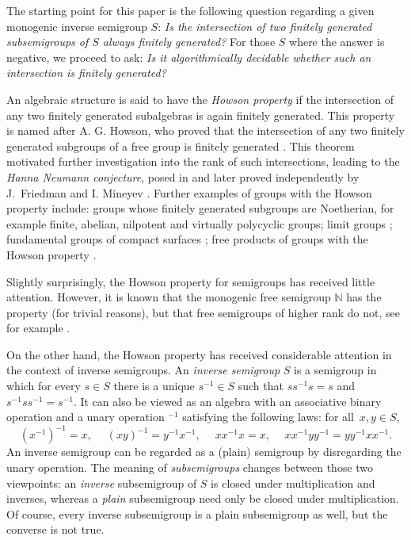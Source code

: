 \documentclass[reqno]{amsart}
\theoremstyle{plain}
\theoremstyle{definition}
\numberwithin{equation}{section}
\begin{document}
The starting point for this paper is the following question regarding a given monogenic inverse semigroup $S$: \emph{Is the intersection of two finitely generated subsemigroups of $S$ always finitely generated?} For those $S$ where the answer is negative, we proceed to ask: \emph{Is it algorithmically decidable whether such an intersection is finitely generated?}

An algebraic structure is said to have the \emph{Howson property} if the intersection of any two finitely generated subalgebras is again finitely generated. This property is named after A. G. Howson, who proved that the intersection of any two finitely generated subgroups of a free group is finitely generated \cite{Howson}. This theorem motivated further investigation into the rank of such intersections, leading to the \emph{Hanna Neumann conjecture}, posed in \cite{Neumann} and later proved independently by J.\ Friedman \cite{Friedman} and I. Mineyev \cite{Mineyev}. Further examples of groups with the Howson property include: 
groups whose finitely generated subgroups are Noetherian, for example finite, abelian, nilpotent and virtually polycyclic groups;
limit groups \cite{Dahmani03}; fundamental groups of compact surfaces \cite{Greenberg60};
free products of groups with the Howson property \cite{Baumslag}.

Slightly surprisingly, the Howson property for semigroups has received little attention. However, it is known that the monogenic free semigroup $\mathbb{N}$ has the property (for trivial reasons), but that free semigroups of higher rank do not, see for example \cite{BlattnerHead}. 


On the other hand, the Howson property has received considerable attention in the context of inverse semigroups.
An \emph{inverse semigroup} $S$ is a semigroup in which for every $s\in S$ there is a unique $s^{-1}\in S$ such that $ss^{-1}s = s$ and $s^{-1}ss^{-1}=s^{-1}$. It can also be viewed as an algebra with an associative binary operation and a unary operation $^{-1}$ satisfying the following laws: for all~$x,y\in S$,
\[
(x^{-1})^{-1} = x, \quad\; (xy)^{-1} = y^{-1}x^{-1},\quad\; xx^{-1}x = x,\quad\; xx^{-1}yy^{-1} = yy^{-1}xx^{-1}.
\]
An inverse semigroup can be regarded as a (plain) semigroup by disregarding the unary operation. The meaning of \emph{subsemigroups} changes between those two viewpoints: an \emph{inverse} subsemigroup of $S$ is closed under multiplication and inverses, whereas a \emph{plain} subsemigroup need only be closed under multiplication. Of course, every inverse subsemigroup is a plain subsemigroup as well, but the converse is not true.
\end{document}
